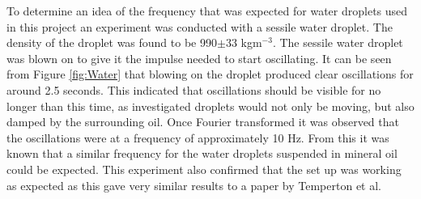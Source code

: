\documentclass{physics_article_B}
\begin{document}
        To determine an idea of the frequency that was expected for water droplets used in this project an experiment was conducted with a sessile water droplet. The density of the droplet was found to be 990$\pm$33 kgm$^{-3}$. The sessile water droplet was blown on to give it the impulse needed to start oscillating. It can be seen from Figure \ref{fig:Water} that blowing on the droplet produced clear oscillations for around 2.5 seconds. This indicated that oscillations should be visible for no longer than this time, as investigated droplets would not only be moving, but also damped by the surrounding oil. Once Fourier transformed it was observed that the oscillations were at a frequency of approximately 10 Hz. From this it was known that a similar frequency for the water droplets suspended in mineral oil could be expected. This experiment also confirmed that the set up was working as expected as this gave very similar results to a paper by Temperton et al\cite{Temperton2012}. 
 
\end{document}
